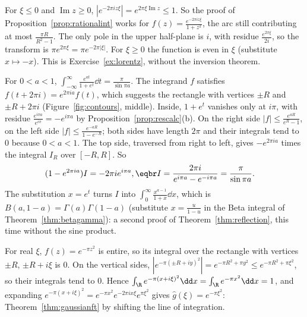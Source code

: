\begin{example}
For $\xi\le0$ and $\operatorname{Im}z\ge0$, $|e^{-2\pi iz\xi}|=e^{2\pi\xi\operatorname{Im}z}\le1$. So the proof of Proposition~\ref{prop:rationalint} works for $f(z)=\frac{e^{-2\pi iz\xi}}{1+z^2}$, the arc
still contributing at most $\frac{\pi R}{R^2-1}$. The only pole in the upper half-plane is $i$, with residue $\frac{e^{2\pi\xi}}{2i}$, so the transform is $\pi e^{2\pi\xi}=\pi e^{-2\pi|\xi|}$.
For $\xi\ge0$ the function is even in $\xi$ (substitute $x\mapsto-x$). This is Exercise~\ref{ex:lorentz}, without the inversion theorem.
\end{example}

\begin{example}\label{ex:rectangle}
For $0<a<1$, $\displaystyle\int_{-\infty}^\infty\frac{e^{at}}{1+e^t}\dd t=\frac\pi{\sin\pi a}$. The integrand $f$ satisfies $f(t+2\pi i)=e^{2\pi ia}f(t)$, which suggests the rectangle
with vertices $\pm R$ and $\pm R+2\pi i$ (Figure~\ref{fig:contours}, middle). Inside, $1+e^t$ vanishes only at $i\pi$, with residue $\frac{e^{i\pi a}}{e^{i\pi}}=-e^{i\pi a}$ by
Proposition~\ref{prop:rescalc}(b). On the right side $|f|\le\frac{e^{aR}}{e^R-1}$, on the left side $|f|\le\frac{e^{-aR}}{1-e^{-R}}$; both sides have length $2\pi$ and their
integrals tend to $0$ because $0<a<1$. The top side, traversed from right to left, gives $-e^{2\pi ia}$ times the integral $I_R$ over $[-R,R]$. So
\[
\begin{aligned}(1-e^{2\pi ia})I&=-2\pi ie^{i\pi a},\eqbr I=\frac{2\pi i}{e^{i\pi a}-e^{-i\pi a}}=\frac\pi{\sin\pi a}.\end{aligned}
\]
The substitution $x=e^t$ turns $I$ into $\int_0^\infty\frac{x^{a-1}}{1+x}\dd x$, which is $B(a,1-a)=\Gamma(a)\Gamma(1-a)$ (substitute $x=\frac u{1-u}$ in the Beta integral of
Theorem~\ref{thm:betagamma}): a second proof of Theorem~\ref{thm:reflection}, this time without the sine product.
\end{example}

\begin{example}
For real $\xi$, $f(z)=e^{-\pi z^2}$ is entire, so its integral over the rectangle with vertices $\pm R$, $\pm R+i\xi$ is $0$. On the vertical sides,
$|e^{-\pi(\pm R+iy)^2}|=e^{-\pi R^2+\pi y^2}\le e^{-\pi R^2+\pi\xi^2}$, so their integrals tend to $0$. Hence $\int_{\R}e^{-\pi(x+i\xi)^2}\dd x=\int_{\R}e^{-\pi x^2}\dd x=1$, and
expanding $e^{-\pi(x+i\xi)^2}=e^{-\pi x^2}e^{-2\pi ix\xi}e^{\pi\xi^2}$ gives $\hat g(\xi)=e^{-\pi\xi^2}$: Theorem~\ref{thm:gaussianft} by shifting the line of integration.
\end{example}

